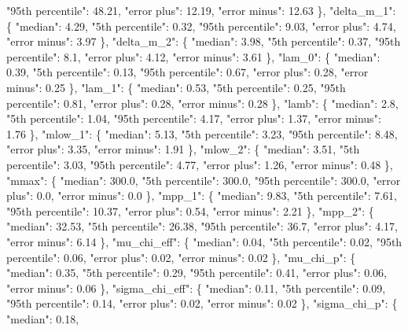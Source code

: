 {{        "95th percentile": 48.21, %
        "error plus": 12.19, %
        "error minus": 12.63%
      \}, %
      "delta\_m\_1": \{%
        "median": 4.29, %
        "5th percentile": 0.32, %
        "95th percentile": 9.03, %
        "error plus": 4.74, %
        "error minus": 3.97%
      \}, %
      "delta\_m\_2": \{%
        "median": 3.98, %
        "5th percentile": 0.37, %
        "95th percentile": 8.1, %
        "error plus": 4.12, %
        "error minus": 3.61%
      \}, %
      "lam\_0": \{%
        "median": 0.39, %
        "5th percentile": 0.13, %
        "95th percentile": 0.67, %
        "error plus": 0.28, %
        "error minus": 0.25%
      \}, %
      "lam\_1": \{%
        "median": 0.53, %
        "5th percentile": 0.25, %
        "95th percentile": 0.81, %
        "error plus": 0.28, %
        "error minus": 0.28%
      \}, %
      "lamb": \{%
        "median": 2.8, %
        "5th percentile": 1.04, %
        "95th percentile": 4.17, %
        "error plus": 1.37, %
        "error minus": 1.76%
      \}, %
      "mlow\_1": \{%
        "median": 5.13, %
        "5th percentile": 3.23, %
        "95th percentile": 8.48, %
        "error plus": 3.35, %
        "error minus": 1.91%
      \}, %
      "mlow\_2": \{%
        "median": 3.51, %
        "5th percentile": 3.03, %
        "95th percentile": 4.77, %
        "error plus": 1.26, %
        "error minus": 0.48%
      \}, %
      "mmax": \{%
        "median": 300.0, %
        "5th percentile": 300.0, %
        "95th percentile": 300.0, %
        "error plus": 0.0, %
        "error minus": 0.0%
      \}, %
      "mpp\_1": \{%
        "median": 9.83, %
        "5th percentile": 7.61, %
        "95th percentile": 10.37, %
        "error plus": 0.54, %
        "error minus": 2.21%
      \}, %
      "mpp\_2": \{%
        "median": 32.53, %
        "5th percentile": 26.38, %
        "95th percentile": 36.7, %
        "error plus": 4.17, %
        "error minus": 6.14%
      \}, %
      "mu\_chi\_eff": \{%
        "median": 0.04, %
        "5th percentile": 0.02, %
        "95th percentile": 0.06, %
        "error plus": 0.02, %
        "error minus": 0.02%
      \}, %
      "mu\_chi\_p": \{%
        "median": 0.35, %
        "5th percentile": 0.29, %
        "95th percentile": 0.41, %
        "error plus": 0.06, %
        "error minus": 0.06%
      \}, %
      "sigma\_chi\_eff": \{%
        "median": 0.11, %
        "5th percentile": 0.09, %
        "95th percentile": 0.14, %
        "error plus": 0.02, %
        "error minus": 0.02%
      \}, %
      "sigma\_chi\_p": \{%
        "median": 0.18, %
}}
